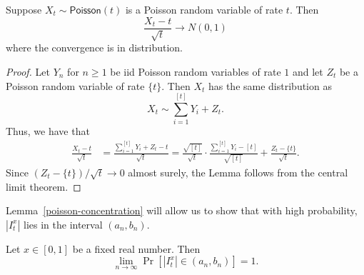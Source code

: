 \documentclass[12pt]{article}
\begin{document}
\begin{lem} \label{poisson-concentration}
	Suppose $X_t \sim \mathsf{Poisson}(t)$ is a Poisson random variable of rate $t$. Then 
	\[
		\frac{X_t - t}{\sqrt{t}} \longrightarrow N(0, 1)
	\]
	where the convergence is in distribution. 
\end{lem}

\begin{proof}
	Let $Y_n$ for $n \geq 1$ be iid Poisson random variables of rate $1$ and let $Z_t$ be a Poisson random variable of rate $\{t\}$. Then $X_t$ has the same distribution as 
	\[
		X_t \sim \sum_{i = 1}^{[t]} Y_i + Z_t.	
	\]
	Thus, we have that 
	\begin{align*}
		\frac{X_t - t}{\sqrt{t}} & = \frac{\sum_{i = 1}^{[t]} Y_i + Z_t-t}{\sqrt{t}} = \frac{\sqrt{[t]}}{\sqrt{t}} \cdot \frac{\sum_{i = 1}^{[t]} Y_i - [t]}{\sqrt{[t]}} + \frac{Z_t - \{t\}}{\sqrt{t}}.
	\end{align*}
	Since $(Z_t - \{t\})/\sqrt{t} \to 0$ almost surely, the Lemma follows from the central limit theorem. 
\end{proof}

Lemma~\ref{poisson-concentration} will allow us to show that with high probability, $|I_t^x|$ lies in the interval $(a_n, b_n)$.

\begin{lem} \label{high-probability-YES}
	Let $x \in [0, 1]$ be a fixed real number. Then 
	\[
		\lim_{n \to \infty} \Pr [ |I_t^x| \in (a_n, b_n) ] = 1. 
	\]
\end{lem}
\end{document}
